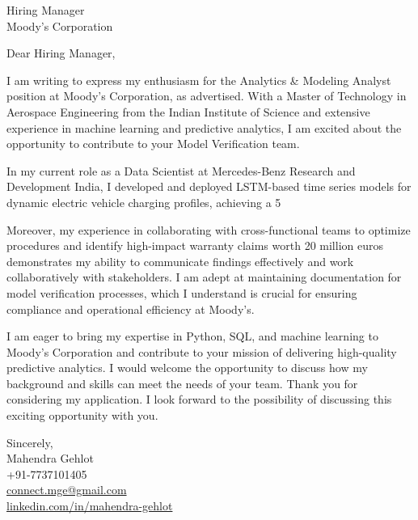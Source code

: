 \documentclass[11pt]{letter}
\begin{document}
\begin{letter}{Hiring Manager \\ Moody's Corporation}

Dear Hiring Manager,

I am writing to express my enthusiasm for the Analytics & Modeling Analyst position at Moody's Corporation, as advertised. With a Master of Technology in Aerospace Engineering from the Indian Institute of Science and extensive experience in machine learning and predictive analytics, I am excited about the opportunity to contribute to your Model Verification team.

In my current role as a Data Scientist at Mercedes-Benz Research and Development India, I developed and deployed LSTM-based time series models for dynamic electric vehicle charging profiles, achieving a 5%

Moreover, my experience in collaborating with cross-functional teams to optimize procedures and identify high-impact warranty claims worth 20 million euros demonstrates my ability to communicate findings effectively and work collaboratively with stakeholders. I am adept at maintaining documentation for model verification processes, which I understand is crucial for ensuring compliance and operational efficiency at Moody's.

I am eager to bring my expertise in Python, SQL, and machine learning to Moody's Corporation and contribute to your mission of delivering high-quality predictive analytics. I would welcome the opportunity to discuss how my background and skills can meet the needs of your team. Thank you for considering my application. I look forward to the possibility of discussing this exciting opportunity with you.

Sincerely, \\
Mahendra Gehlot \\
+91-7737101405 \\
\href{mailto:connect.mge@gmail.com}{connect.mge@gmail.com} \\
\href{https://www.linkedin.com/in/mahendra-gehlot}{linkedin.com/in/mahendra-gehlot} \\

\end{letter}
\end{document}
